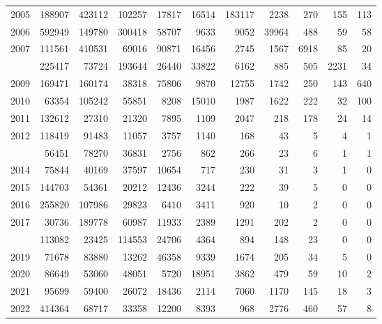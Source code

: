 \documentclass[
]{article}
\begin{document}
\begin{longtable}[t]{lrrrrrrrrrr}
2005 & 188907 & 423112 & 102257 & 17817 & 16514 & 183117 & 2238 & 270 & 155 & 113\\
2006 & 592949 & 149780 & 300418 & 58707 & 9633 & 9052 & 39964 & 488 & 59 & 58\\
2007 & 111561 & 410531 & 69016 & 90871 & 16456 & 2745 & 1567 & 6918 & 85 & 20\\
\addlinespace
2008 & 225417 & 73724 & 193644 & 26440 & 33822 & 6162 & 885 & 505 & 2231 & 34\\
2009 & 169471 & 160174 & 38318 & 75806 & 9870 & 12755 & 1742 & 250 & 143 & 640\\
2010 & 63354 & 105242 & 55851 & 8208 & 15010 & 1987 & 1622 & 222 & 32 & 100\\
2011 & 132612 & 27310 & 21320 & 7895 & 1109 & 2047 & 218 & 178 & 24 & 14\\
2012 & 118419 & 91483 & 11057 & 3757 & 1140 & 168 & 43 & 5 & 4 & 1\\
\addlinespace
2013 & 56451 & 78270 & 36831 & 2756 & 862 & 266 & 23 & 6 & 1 & 1\\
2014 & 75844 & 40169 & 37597 & 10654 & 717 & 230 & 31 & 3 & 1 & 0\\
2015 & 144703 & 54361 & 20212 & 12436 & 3244 & 222 & 39 & 5 & 0 & 0\\
2016 & 255820 & 107986 & 29823 & 6410 & 3411 & 920 & 10 & 2 & 0 & 0\\
2017 & 30736 & 189778 & 60987 & 11933 & 2389 & 1291 & 202 & 2 & 0 & 0\\
\addlinespace
2018 & 113082 & 23425 & 114553 & 24706 & 4364 & 894 & 148 & 23 & 0 & 0\\
2019 & 71678 & 83880 & 13262 & 46358 & 9339 & 1674 & 205 & 34 & 5 & 0\\
2020 & 86649 & 53060 & 48051 & 5720 & 18951 & 3862 & 479 & 59 & 10 & 2\\
2021 & 95699 & 59400 & 26072 & 18436 & 2114 & 7060 & 1170 & 145 & 18 & 3\\
2022 & 414364 & 68717 & 33358 & 12200 & 8393 & 968 & 2776 & 460 & 57 & 8\\*
\end{longtable}
\end{document}
